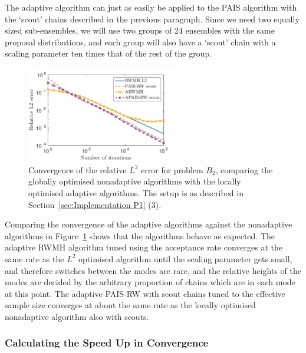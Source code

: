 \documentclass[final]{siamltex}
\begin{document}
The adaptive algorithm can just as easily be applied to the PAIS algorithm with the `scout' chains described in the previous paragraph. Since we need two equally sized sub-ensembles, we will use two groups of 24 ensembles with the same proposal distributions, and each group will also have a `scout' chain with a scaling parameter ten times that of the rest of the group.

\begin{figure}[htb]
\begin{center}
\includegraphics[width=0.6\textwidth]{"figures/BM2_AL2"}
\caption{Convergence of the relative $L^2$ error for problem $B_2$, comparing the globally optimised nonadaptive algorithms with the locally optimised adaptive algorithms. The setup is as described in Section~\ref{sec:Implementation P1} (3).}
\label{fig:BM2_AL2}
\end{center}
\end{figure}

Comparing the convergence of the adaptive algorithms against the
nonadaptive algorithms in Figure~\ref{fig:BM2_AL2} shows that the
algorithms behave as expected. The adaptive RWMH algorithm tuned using
the acceptance rate converges at the same rate as the $L^2$ optimised
algorithm until the scaling parameter gets small, and therefore
switches between the modes are rare, and the relative heights of the
modes are decided by the arbitrary proportion of chains which are in
each mode at this point. The adaptive PAIS-RW with scout chains tuned to the effective sample size converges at about the same rate as the locally optimised nonadaptive algorithm also with scouts.

\subsubsection{Calculating the Speed Up in Convergence}\label{sec:calc_saving}
\end{document}

